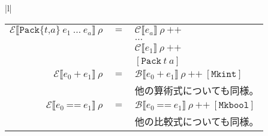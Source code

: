 \documentclass{jarticle}
\begin{document}
\begin{tabular} {|l|}
\begin{tabular}{r c l}
		$\mathcal{E} \llbracket \texttt{Pack\{} t \texttt{,} a \texttt{\}} ~ e_1 ~ \ldots ~ e_a \rrbracket ~ \rho$ & $=$ & $\mathcal{C} \llbracket e_a \rrbracket ~ \rho ~ \texttt{++}$                                                                                                                                 \\
		                                                                                                           &     & $\ldots$                                                                                                                                                                                     \\
		                                                                                                           &     & $\mathcal{C} \llbracket e_1 \rrbracket ~ \rho ~ \texttt{++}$                                                                                                                                 \\
		                                                                                                           &     & $\left[\texttt{Pack} ~ t ~ a \right]$                                                                                                                                                        \\
		$\mathcal{E} \llbracket e_0 ~ \texttt{+} ~ e_1 \rrbracket ~ \rho$                                          & $=$ & $\mathcal{B} \llbracket e_0 ~ \texttt{+} ~ e_1 \rrbracket ~ \rho ~ \texttt{++} ~ \left[\texttt{Mkint} \right]$                                                                               \\
		                                                                                                           &     & 他の算術式についても同様。                                                                                                                                                                   \\
		$\mathcal{E} \llbracket e_0 ~ \texttt{==} ~ e_1 \rrbracket ~ \rho$                                         & $=$ & $\mathcal{B} \llbracket e_0 ~ \texttt{==} ~ e_1 \rrbracket ~ \rho ~ \texttt{++} ~ \left[\texttt{Mkbool} \right]$                                                                             \\
		                                                                                                           &     & 他の比較式についても同様。                                                                                                                                                                   \\

\end{tabular}
\end{tabular}
\end{document}

